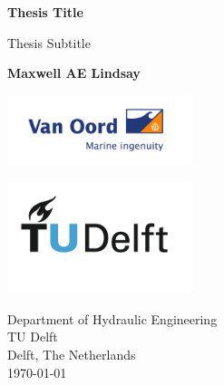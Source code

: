 \begin{titlepage}
  \begin{center}
      \vspace*{1cm}
      \color{black}
      \Huge
      \textbf{Thesis Title}

      \vspace{0.5cm}
       Thesis Subtitle
           
      \vspace{1.5cm}
      \Large
      \textbf{Maxwell AE Lindsay}

      \large
      \vfill
           
           
      \vspace{0.8cm}
    
      \includegraphics[width=0.4\textwidth]{figures/VanOord-2048x785.png}

      \includegraphics[width=0.4\textwidth]{figures/TU_P1_full-color.png}
           
      Department of Hydraulic Engineering\\
      TU Delft\\
      Delft, The Netherlands\\
      \today
           
  \end{center}
\end{titlepage}